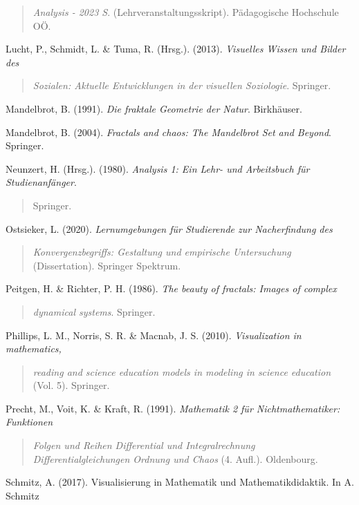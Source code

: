 \documentclass[a4paper, 12pt]{book}
\begin{document}
\begin{quote}
\emph{Analysis - 2023 S}. (Lehrveranstaltungsskript). Pädagogische
Hochschule OÖ.
\end{quote}

Lucht, P., Schmidt, L. \& Tuma, R. (Hrsg.). (2013). \emph{Visuelles
Wissen und Bilder des}

\begin{quote}
\emph{Sozialen: Aktuelle Entwicklungen in der visuellen Soziologie}.
Springer.
\end{quote}

Mandelbrot, B. (1991). \emph{Die fraktale Geometrie der Natur}.
Birkhäuser.

Mandelbrot, B. (2004). \emph{Fractals and chaos: The Mandelbrot Set and
Beyond}. Springer.

Neunzert, H. (Hrsg.). (1980). \emph{Analysis 1: Ein Lehr- und
Arbeitsbuch für Studienanfänger}.

\begin{quote}
Springer.
\end{quote}

Ostsieker, L. (2020). \emph{Lernumgebungen für Studierende zur
Nacherfindung des}

\begin{quote}
\emph{Konvergenzbegriffs: Gestaltung und empirische Untersuchung}
(Dissertation). Springer Spektrum.
\end{quote}

Peitgen, H. \& Richter, P. H. (1986). \emph{The beauty of fractals:
Images of complex}

\begin{quote}
\emph{dynamical systems}. Springer.
\end{quote}

Phillips, L. M., Norris, S. R. \& Macnab, J. S. (2010).
\emph{Visualization in mathematics,}

\begin{quote}
\emph{reading and science education models in modeling in science
education} (Vol. 5). Springer.
\end{quote}

Precht, M., Voit, K. \& Kraft, R. (1991). \emph{Mathematik 2 für
Nichtmathematiker: Funktionen}

\begin{quote}
\emph{Folgen und Reihen Differential und Integralrechnung
Differentialgleichungen Ordnung und Chaos} (4. Aufl.). Oldenbourg.
\end{quote}

Schmitz, A. (2017). Visualisierung in Mathematik und Mathematikdidaktik.
In A. Schmitz
\end{document}

